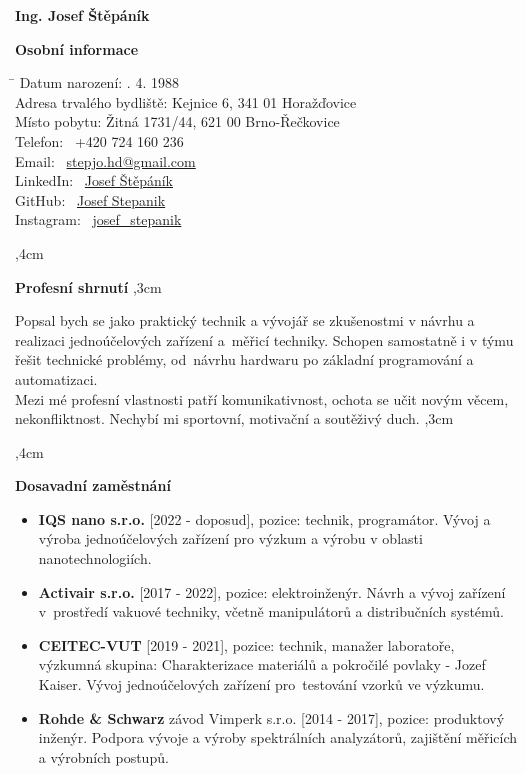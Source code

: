 \documentclass[10pt]{article}
\begin{document}
\begin{center}
\textbf{\LARGE Ing. Josef Štěpáník} \\
\end{center}

\textbf{Osobní informace} 

\begin{tabbing}
    \hspace{6cm}\= \kill
    Datum narození: . 4. 1988 \\
    Adresa trvalého bydliště: \> Kejnice 6, 341 01 Horažďovice \\
    Místo pobytu: \> Žitná 1731/44, 621 00 Brno-Řečkovice \\
    Telefon: \> \faPhone \ +420 724 160 236 \\
    Email: \> \faEnvelope \ \href{mailto:stepjo.hd@gmail.com}{stepjo.hd@gmail.com} \\
    LinkedIn: \>  \faLinkedin \ \href{https://www.linkedin.com/in/josef-štěpáník-30106174/}{Josef Štěpáník} \\
    GitHub: \>  \faGithub \ \href{https://github.com/JosefStepanik}{Josef Stepanik} \\
    Instagram: \>  \faInstagram \ \href{https://www.instagram.com/josef_stepanik/}{josef\_stepanik}
\end{tabbing}

\noindent\hrulefill
{},4cm

\textbf{Profesní shrnutí}
,3cm

\indent Popsal bych se jako praktický technik a vývojář se zkušenostmi v návrhu a realizaci jednoúčelových zařízení a~měřicí techniky. 
Schopen samostatně i v týmu řešit technické problémy, od~návrhu hardwaru po základní programování a automatizaci. \\
\indent Mezi mé profesní vlastnosti patří komunikativnost, ochota se učit novým věcem, nekonfliktnost. Nechybí mi sportovní, motivační a soutěživý duch.
,3cm

\noindent\hrulefill
{},4cm

\textbf{Dosavadní zaměstnání}

\begin{itemize}
\item \textbf{IQS nano s.r.o.} [2022 - doposud], pozice: technik, programátor. Vývoj a výroba jednoúčelových zařízení pro výzkum a výrobu v oblasti nanotechnologiích.
\item \textbf{Activair s.r.o.} [2017 - 2022], pozice: elektroinženýr. Návrh a vývoj zařízení v~prostředí vakuové techniky, včetně manipulátorů a distribučních systémů.
\item \textbf{CEITEC-VUT} [2019 - 2021], pozice: technik, manažer laboratoře, výzkumná skupina: Charakterizace materiálů a pokročilé povlaky - Jozef Kaiser. 
Vývoj jednoúčelových zařízení pro~testování vzorků ve výzkumu. 
\item \textbf{Rohde \& Schwarz} závod Vimperk s.r.o. [2014 - 2017], pozice: produktový inženýr. Podpora vývoje a výroby spektrálních analyzátorů, zajištění měřicích a výrobních postupů. 
\end{itemize}
\end{document}
